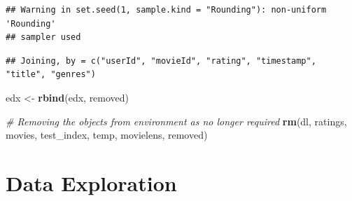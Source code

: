\documentclass[]{article}
\newenvironment{Shaded}{\begin{snugshade}}{\end{snugshade}}
\newcommand{\CommentTok}[1]{\textcolor[rgb]{0.56,0.35,0.01}{\textit{#1}}}
\newcommand{\DataTypeTok}[1]{\textcolor[rgb]{0.13,0.29,0.53}{#1}}
\newcommand{\DecValTok}[1]{\textcolor[rgb]{0.00,0.00,0.81}{#1}}
\newcommand{\FloatTok}[1]{\textcolor[rgb]{0.00,0.00,0.81}{#1}}
\newcommand{\KeywordTok}[1]{\textcolor[rgb]{0.13,0.29,0.53}{\textbf{#1}}}
\newcommand{\NormalTok}[1]{#1}
\newcommand{\OperatorTok}[1]{\textcolor[rgb]{0.81,0.36,0.00}{\textbf{#1}}}
\newcommand{\OtherTok}[1]{\textcolor[rgb]{0.56,0.35,0.01}{#1}}
\newcommand{\StringTok}[1]{\textcolor[rgb]{0.31,0.60,0.02}{#1}}
\begin{document}
\begin{verbatim}
## Warning in set.seed(1, sample.kind = "Rounding"): non-uniform 'Rounding'
## sampler used
\end{verbatim}

\begin{Shaded}
\end{Shaded}

\begin{verbatim}
## Joining, by = c("userId", "movieId", "rating", "timestamp", "title", "genres")
\end{verbatim}

\begin{Shaded}
\begin{Highlighting}[]
\NormalTok{ edx <-}\StringTok{ }\KeywordTok{rbind}\NormalTok{(edx, removed)}

 \CommentTok{# Removing the objects from environment as no longer required}
\KeywordTok{rm}\NormalTok{(dl, ratings, movies, test_index, temp, movielens, removed)}
\end{Highlighting}
\end{Shaded}

\section{Data Exploration}
\label{sec:dataexploration}
\end{document}
